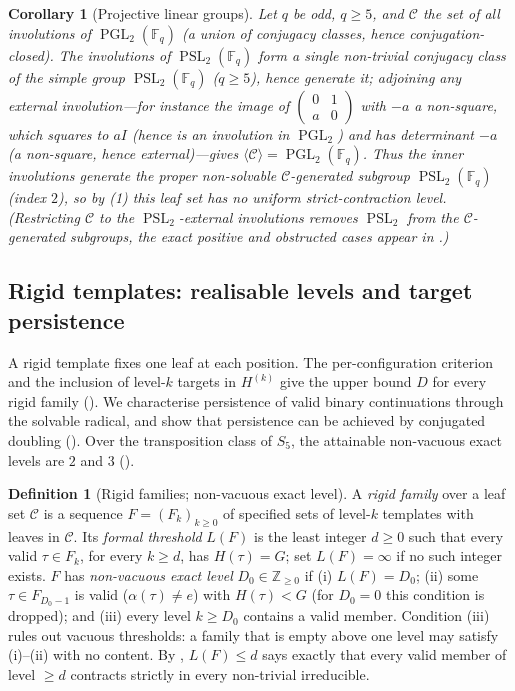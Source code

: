 \documentclass[11pt]{amsart}
\newtheorem{corollary}[corollary]{Corollary}
\theoremstyle{definition}
\newtheorem{definition}[definition]{Definition}
\theoremstyle{remark}
\theoremstyle{plain}
\theoremstyle{plain}
\numberwithin{equation}{section}
\DeclareMathOperator{\PGL}{PGL}
\DeclareMathOperator{\PSL}{PSL}
\newcommand{\F}{\mathbb{F}}
\begin{document}
\begin{corollary}[Projective linear groups]
\label{cor:pgl2}
Let $q$ be odd, $q\ge5$, and $\mathcal{C}$ the set of all involutions of $\PGL_2(\F_q)$
(a union of conjugacy classes, hence conjugation-closed). The involutions of
$\PSL_2(\F_q)$ form a single non-trivial conjugacy class of the simple group
$\PSL_2(\F_q)$ ($q\ge5$), hence generate it; adjoining any external involution---for
instance the image of $\left(\begin{smallmatrix}0&1\\ a&0\end{smallmatrix}\right)$ with
$-a$ a non-square, which squares to $aI$ (hence is an involution in $\PGL_2$) and has
determinant $-a$ (a non-square, hence external)---gives
$\langle\mathcal{C}\rangle=\PGL_2(\F_q)$. Thus the inner involutions generate the
proper non-solvable $\mathcal{C}$-generated subgroup $\PSL_2(\F_q)$ (index $2$), so by
(1) this leaf set has no uniform strict-contraction level. {\normalfont(Restricting $\mathcal{C}$ to the
$\PSL_2$-external involutions removes $\PSL_2$ from the $\mathcal{C}$-generated subgroups,
the exact positive and obstructed cases appear in .)}
\end{corollary}

\subsection{Rigid templates: realisable levels and target persistence}
\label{subsec:rigid}
A rigid template fixes one leaf at each position. The per-configuration
criterion and the inclusion of level-$k$ targets in $H^{(k)}$ give the
upper bound $D$ for every rigid family (). We
characterise persistence of valid binary continuations through the
solvable radical, and show that persistence can be achieved by
conjugated doubling
(). Over the transposition
class of $S_5$, the attainable non-vacuous exact levels are $2$ and $3$
().

\begin{definition}[Rigid families; non-vacuous exact level]
\label{def:rigidfamily}
A \emph{rigid family} over a leaf set $\mathcal{C}$ is a sequence
$F=(F_k)_{k\ge0}$ of specified sets of level-$k$ templates with leaves
in $\mathcal{C}$. Its \emph{formal threshold} $L(F)$ is the least integer
$d\ge0$ such that every valid $\tau\in F_k$, for every $k\ge d$, has
$H(\tau)=G$; set $L(F)=\infty$ if no such integer exists.
$F$ has \emph{non-vacuous exact level} $D_0\in\mathbb{Z}_{\ge0}$ if (i) $L(F)=D_0$; (ii) some
$\tau\in F_{D_0-1}$ is valid ($\alpha(\tau)\neq e$) with $H(\tau)<G$ (for $D_0=0$ this condition
is dropped); and (iii) every level $k\ge D_0$ contains a valid member. Condition (iii) rules out
vacuous thresholds: a family that is empty above one level may satisfy (i)--(ii) with no
content. By , $L(F)\le d$ says exactly that every valid member of level
$\ge d$ contracts strictly in every non-trivial irreducible.
\end{definition}
\end{document}
